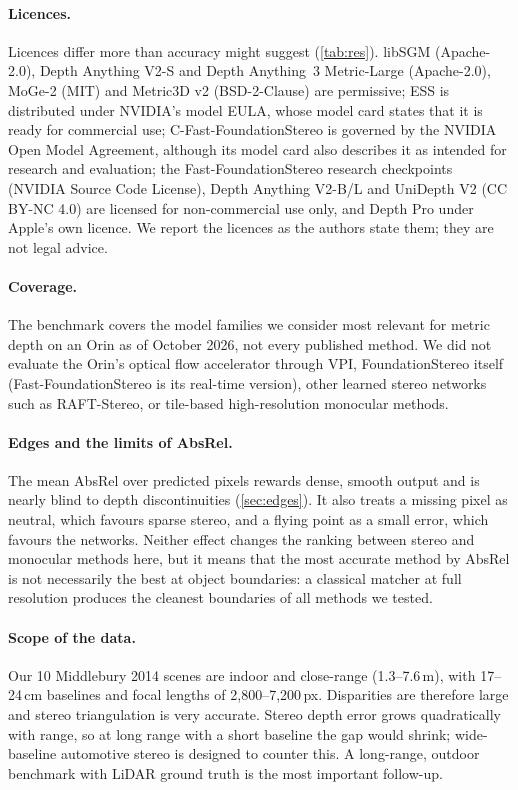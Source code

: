 \documentclass[10pt,twocolumn]{article}
\begin{document}
\paragraph{Licences.} Licences differ more than accuracy might suggest (\cref{tab:res}). libSGM
(Apache-2.0), Depth Anything V2-S and Depth Anything~3 Metric-Large (Apache-2.0), MoGe-2 (MIT) and
Metric3D v2 (BSD-2-Clause) are permissive; ESS is distributed under NVIDIA's model EULA, whose model
card states that it is ready for commercial use; C-Fast-FoundationStereo is governed by the NVIDIA Open
Model Agreement, although its model card also describes it as intended for research and evaluation;
the Fast-FoundationStereo research checkpoints (NVIDIA Source Code License),
Depth Anything V2-B/L and UniDepth V2 (CC BY-NC 4.0) are licensed for non-commercial use only, and
Depth Pro under Apple's own licence. We report the licences as the authors state them; they are not
legal advice.

\paragraph{Coverage.} The benchmark covers the model families we consider most relevant for metric depth
on an Orin as of October 2026, not every published method. We did not evaluate the Orin's optical flow
accelerator through VPI, FoundationStereo itself (Fast-FoundationStereo is its real-time version),
other learned stereo networks such as RAFT-Stereo, or tile-based high-resolution monocular methods.

\paragraph{Edges and the limits of AbsRel.} The mean AbsRel over predicted pixels rewards dense,
smooth output and is nearly blind to depth discontinuities (\cref{sec:edges}). It also treats a missing
pixel as neutral, which favours sparse stereo, and a flying point as a small error, which favours the
networks. Neither effect changes the ranking between stereo and monocular methods here, but it means
that the most accurate method by AbsRel is not necessarily the best at object boundaries: a classical
matcher at full resolution produces the cleanest boundaries of all methods we tested.

\paragraph{Scope of the data.} Our 10 Middlebury 2014 scenes are indoor and close-range (1.3--7.6\,m),
with 17--24\,cm baselines and focal lengths of 2{,}800--7{,}200\,px. Disparities are therefore large and
stereo triangulation is very accurate. Stereo depth error grows quadratically with range, so at long
range with a short baseline the gap would shrink; wide-baseline automotive stereo is designed to
counter this. A long-range, outdoor benchmark with LiDAR ground truth is the most important follow-up.
\end{document}
